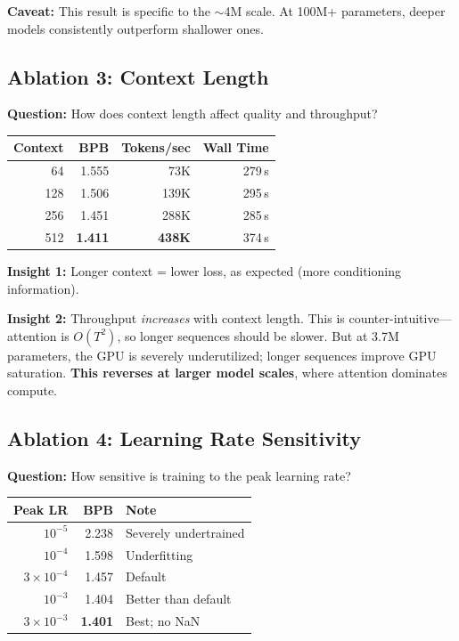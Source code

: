 \textbf{Caveat:} This result is specific to the $\sim$4M scale.
At 100M+ parameters, deeper models consistently outperform shallower ones.


\subsection{Ablation 3: Context Length}

\textbf{Question:} How does context length affect quality and throughput?

\begin{center}
\begin{tabular}{rrrr}
\toprule
Context & BPB & Tokens/sec & Wall Time \\
\midrule
64  & 1.555 &  73K & 279\,s \\
128 & 1.506 & 139K & 295\,s \\
256 & 1.451 & 288K & 285\,s \\
512 & \textbf{1.411} & \textbf{438K} & 374\,s \\
\bottomrule
\end{tabular}
\end{center}

\textbf{Insight 1:} Longer context = lower loss, as expected (more conditioning information).

\textbf{Insight 2:} Throughput \emph{increases} with context length.
This is counter-intuitive---attention is $O(T^2)$, so longer sequences should be slower.
But at 3.7M parameters, the GPU is severely underutilized; longer sequences improve GPU saturation.
\textbf{This reverses at larger model scales}, where attention dominates compute.


\subsection{Ablation 4: Learning Rate Sensitivity}

\textbf{Question:} How sensitive is training to the peak learning rate?

\begin{center}
\begin{tabular}{rrl}
\toprule
Peak LR & BPB & Note \\
\midrule
$10^{-5}$ & 2.238 & Severely undertrained \\
$10^{-4}$ & 1.598 & Underfitting \\
$3 \times 10^{-4}$ & 1.457 & Default \\
$10^{-3}$ & 1.404 & Better than default \\
$3 \times 10^{-3}$ & \textbf{1.401} & Best; no NaN \\
\bottomrule
\end{tabular}
\end{center}

